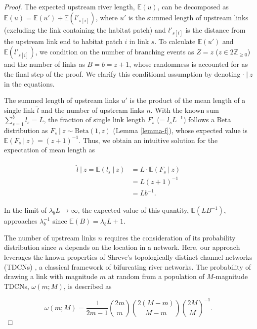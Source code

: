 \documentclass[11pt, class=article, crop=false]{standalone}
\theoremstyle{definition}
\begin{document}
\begin{proof}
The expected upstream river length, $\mathbb{E}(u)$, can be decomposed as $\mathbb{E}(u) = \mathbb{E}(u') + \mathbb{E}(l'_{s[i]})$, where $u'$ is the summed length of upstream links (excluding the link containing the habitat patch) and $l'_{s[i]}$ is the distance from the upstream link end to habitat patch $i$ in link $s$.
To calculate $\mathbb{E}(u')$ and $\mathbb{E}(l'_{s[i]})$, we condition on the number of branching events as $Z = z$ ($z \in 2\mathbb{Z}_{\ge 0}$) and the number of links as $B = b = z + 1$, whose randomness is accounted for as the final step of the proof.
We clarify this conditional assumption by denoting $\cdot ~|~ z$ in the equations.

The summed length of upstream links $u'$ is the product of the mean length of a single link $\hat{l}$ and the number of upstream links $n$.
With the known sum $\sum_{s=1}^b l_s = L$, the fraction of single link length $F_s$ (= $l_s L^{-1}$) follows a Beta distribution as $F_s ~|~ z \sim \mbox{Beta}(1, z)$ (Lemma \ref{lemma-f}), whose expected value is $\mathbb{E}(F_s~|~z) = (z + 1)^{-1}$.
Thus, we obtain an intuitive solution for the expectation of mean length as

\begin{align}
    \begin{split}
    \hat{l}~|~z = \mathbb{E}(l_s~|~z) &= L \cdot \mathbb{E}(F_s~|~z)\\
                                      &= L(z + 1)^{-1}\\
                                      &= Lb^{-1}.
    \end{split}
\end{align}

In the limit of $\lambda_b L \rightarrow \infty$, the expected value of this quantity, $\mathbb{E}(LB^{-1})$, approaches $\lambda_b^{-1}$ since $\mathbb{E}(B) = \lambda_b L + 1$.

The number of upstream links $n$ requires the consideration of its probability distribution since $n$ depends on the location in a network.
Here, our approach leverages the known properties of Shreve's topologically distinct channel networks (TDCNs) \citep{shreve_infinite_1967}, a classical framework of bifurcating river networks.
The probability of drawing a link with magnitude $m$ at random from a population of $M$-magnitude TDCNs, $\omega(m; M)$, is described as

\begin{equation}
    \omega(m; M) = \frac{1}{2m - 1} \binom{2m}{m} \binom{2(M - m)}{M - m} \binom{2M}{M}^{-1}.
\end{equation}


\end{proof}
\end{document}
